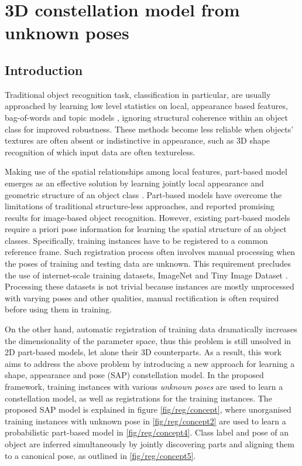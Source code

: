 \chapter{3D constellation model from unknown poses}
\label{chap/reg}

\section{Introduction}
\label{sec/reg/intro}

Traditional object recognition task, classification in particular, are usually approached by learning low level statistics on local, appearance based features, \eg bag-of-words \cite{Sivic2005, Fei-Fei2005} and topic models \cite{Fergus2005}, ignoring structural coherence within an object class for improved robustness. These methods become less reliable when objects' textures are often absent or indistinctive in appearance, such as 3D shape recognition of which input data are often textureless. 

Making use of the spatial relationships among local features, part-based model emerges as an effective solution by learning jointly local appearance and geometric structure of an object class \cite{Weber2000, Felzenszwalb2005, Fergus2007}. 
Part-based models have overcome the limitations of traditional structure-less approaches, and reported promising results for image-based object recognition. However, existing part-based models require a priori pose information for learning the spatial structure of an object classes. Specifically, training instances have to be registered to a common reference frame. Such registration process often involves manual processing when the poses of training and testing data are unknown. This requirement precludes the use of internet-scale training datasets, \eg ImageNet \cite{Deng2009} and Tiny Image Dataset \cite{Torralba2008}. Processing these datasets is not trivial because instances are mostly unprocessed with varying poses and other qualities, manual rectification is often required before using them in training. 

On the other hand, automatic registration of training data dramatically increases the dimensionality of the parameter space, thus this problem is still unsolved in 2D part-based models, let alone their 3D counterparts. 
As a result, this work aims to address the above problem by introducing a new approach for learning a shape, appearance and pose (SAP) constellation model. 
In the proposed framework, training instances with various \emph{unknown poses} are used to learn a constellation model, as well as registrations for the training instances. The proposed SAP model is explained in figure \ref{fig/reg/concept}, where unorganised training instances with unknown pose in \ref{fig/reg/concept2} are used to learn a probabilistic part-based model in \ref{fig/reg/concept4}. Class label and pose of an object are inferred simultaneously by jointly discovering parts and aligning them to a canonical pose, as outlined in \ref{fig/reg/concept5}. 

